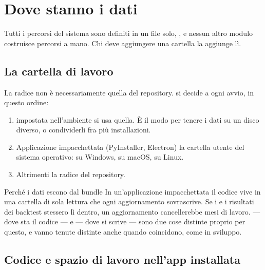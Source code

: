 \section{Dove stanno i dati}\label{sez:dati}

Tutti i percorsi del sistema sono definiti in un file solo,
, e nessun altro modulo costruisce percorsi a mano. Chi
deve aggiungere una cartella la aggiunge lì.

\subsection{La cartella di lavoro}

La radice non è necessariamente quella del repository. 
si decide a ogni avvio, in questo ordine:

\begin{enumerate}
  \item {} impostata nell'ambiente \freccia{} si usa quella. È il
        modo per tenere i dati su un disco diverso, o condividerli fra più
        installazioni.
  \item Applicazione impacchettata (PyInstaller, Electron) \freccia{} la
        cartella utente del sistema operativo:
         su Windows,
         su macOS,
         su Linux.
  \item Altrimenti \freccia{} la radice del repository.
\end{enumerate}

\begin{perche}{Perché i dati escono dal bundle}
In un'applicazione impacchettata il codice vive in una cartella di sola
lettura che ogni aggiornamento sovrascrive. Se i  e i risultati
dei backtest stessero lì dentro, un aggiornamento cancellerebbe mesi di
lavoro.  --- dove sta il codice --- e
 --- dove si scrive --- sono due cose distinte proprio
per questo, e vanno tenute distinte anche quando coincidono, come in sviluppo.
\end{perche}

\subsection{Codice e spazio di lavoro nell'app installata}\label{sez:artefatti-spazio}

